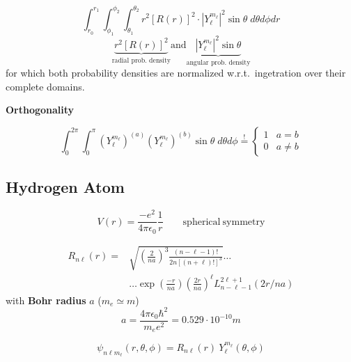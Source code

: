 \newpar{}

\noindent\begin{equation*}
    \int_{r_0}^{r_1} \int_{\phi_1}^{\phi_2} \int_{\theta_1}^{\theta_2} r^2 {\left[R(r)\right]}^2 \cdot |Y_\ell^{m_\ell}|^2 \sin\theta\;d\theta d\phi dr
\end{equation*}
\begin{equation*}
    \underbrace{r^2 {\left[R(r)\right]}^2}_{\text{radial prob.\ density}} \text{and} \underbrace{|Y_\ell^{m_\ell}|^2 \sin\theta}_{\text{angular prob.\ density}}
\end{equation*}
for which both probability densities are normalized w.r.t.\ ingetration over their complete domains.

\textbf{Orthogonality}

\noindent\begin{equation*}
    \int_0^{2\pi}\int_0^{\pi} {(Y_\ell^{m_\ell})}^{(a)}{(Y_\ell^{m_\ell})}^{(b)} \sin\theta\;d\theta d\phi \overset{!}{=} \begin{cases}
        1 & a=b     \\
        0 & a\neq b
    \end{cases}
\end{equation*}

\subsection{Hydrogen Atom}
\noindent\begin{equation*}
    V(r) = \frac{-e^2}{4\pi\epsilon_0}\frac{1}{r}\qquad \mathrm{spherical\ symmetry}
\end{equation*}

\begin{align*}
    R_{n\ell}(r) = & \sqrt{{\left(\frac{2}{na}\right)}^3\frac{(n-\ell-1)!}{2n{[(n+\ell)!]}^3}} \ldots                    \\
                   & \ldots\exp\left(\frac{-r}{na}\right){\left(\frac{2r}{na}\right)}^\ell L_{n-\ell-1}^{2\ell+1}(2r/na)
\end{align*}
with \textbf{Bohr radius} $a$ ($m_e\simeq m$)
\begin{equation*}
    a = \frac{4\pi\epsilon_0\hbar^2}{m_e e^2}=0.529 \cdot 10^{-10}m
\end{equation*}

\begin{equation*}
    \psi_{n\ell m_\ell}(r,\theta,\phi) = R_{n\ell}(r)\:Y_\ell^{m_\ell}(\theta, \phi)
\end{equation*}

